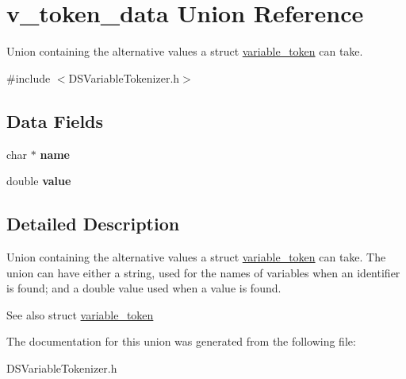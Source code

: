 \hypertarget{unionv__token__data}{
\section{v\_\-token\_\-data Union Reference}
\label{unionv__token__data}
}


Union containing the alternative values a struct \hyperlink{structvariable__token}{variable\_\-token} can take.  




{\ttfamily \#include $<$DSVariableTokenizer.h$>$}

\subsection*{Data Fields}
\begin{DoxyCompactItemize}
\item 
\hypertarget{unionv__token__data_a5ac083a645d964373f022d03df4849c8}{
char $\ast$ {\bfseries name}}
\label{unionv__token__data_a5ac083a645d964373f022d03df4849c8}

\item 
\hypertarget{unionv__token__data_aee90379adb0307effb138f4871edbc5c}{
double {\bfseries value}}
\label{unionv__token__data_aee90379adb0307effb138f4871edbc5c}

\end{DoxyCompactItemize}


\subsection{Detailed Description}
Union containing the alternative values a struct \hyperlink{structvariable__token}{variable\_\-token} can take. The union can have either a string, used for the names of variables when an identifier is found; and a double value used when a value is found.

\begin{DoxySeeAlso}{See also}
struct \hyperlink{structvariable__token}{variable\_\-token} 
\end{DoxySeeAlso}


The documentation for this union was generated from the following file:\begin{DoxyCompactItemize}
\item 
DSVariableTokenizer.h\end{DoxyCompactItemize}
